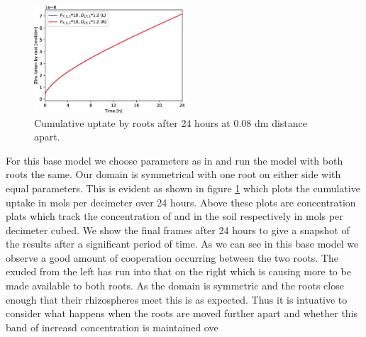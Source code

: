 \documentclass[11pt]{article}
\numberwithin{equation}{section}
\begin{document}
\begin{figure}[h]
    \centering
    \includegraphics[width=0.5\textwidth]{Figures/testpics/ZnCumulative/BasicModelCumuZn.eps}
    \caption{Cumulative  uptate by roots after 24 hours at $0.08$ \si{dm} distance apart.}
    \label{fig:OneCn}
\end{figure}
For this base model we choose parameters as in \cite{Ptashnyk-2011} and run the model with both roots the same. Our domain is symmetrical with one root on either side with equal parameters. This is evident as shown in figure \ref{fig:OneCn} which plots the cumulative  uptake  in mols per decimeter over 24 hours. Above these plots are concentration plats which track the concentration of  and  in the soil respectively in mols per decimeter cubed. We show the final frames after 24 hours to give a snapshot of the results after a significant period of time. As we can see in this base model we observe a good amount of cooperation occurring between the two roots. The  exuded from the left has run into that on the right which is causing more  to be made available to both roots. As the domain is symmetric and the roots close enough that their rhizospheres meet this is as expected. Thus it is intuative to consider what happens when the roots are moved further apart and whether this band of increasd  concentration is maintained ove 
\end{document}
